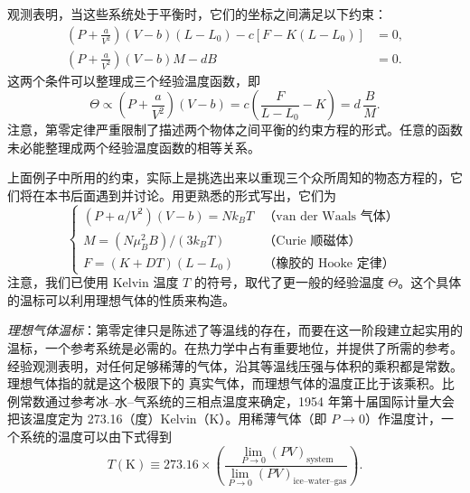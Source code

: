
观测表明，当这些系统处于平衡时，它们的坐标之间满足以下约束：
\begin{equation}
\begin{aligned}
\left(P+\frac{a}{V^2}\right)(V-b)(L-L_0)-c\left[F-K(L-L_0)\right]&=0,\\
\left(P+\frac{a}{V^2}\right)(V-b)M-dB&=0.
\end{aligned}
\label{eq:1.7}
\end{equation}
这两个条件可以整理成三个经验温度函数，即
\begin{equation}
\Theta\propto\left(P+\frac{a}{V^2}\right)(V-b)=c\left(\frac{F}{L-L_0}-K\right)=d\,\frac{B}{M}.
\label{eq:1.8}
\end{equation}
注意，第零定律严重限制了描述两个物体之间平衡的约束方程的形式。任意的函数未必能整理成两个经验温度函数的相等关系。

上面例子中所用的约束，实际上是挑选出来以重现三个众所周知的物态方程的，它们将在本书后面遇到并讨论。用更熟悉的形式写出，它们为
\begin{equation}
\left\{
\begin{array}{ll}
(P+a/V^2)(V-b)=Nk_BT & \text{（van der Waals 气体）}\\[2pt]
M=(N\mu_B^2B)/(3k_BT) & \text{（Curie 顺磁体）}\\[2pt]
F=(K+DT)(L-L_0) & \text{（橡胶的 Hooke 定律）}
\end{array}
\right.
\label{eq:1.9}
\end{equation}
注意，我们已使用 Kelvin 温度 $T$ 的符号，取代了更一般的经验温度 $\Theta$。这个具体的温标可以利用理想气体的性质来构造。

\emph{理想气体温标}：第零定律只是陈述了等温线的存在，而要在这一阶段建立起实用的温标，一个参考系统是必需的。在热力学中占有重要地位，并提供了所需的参考。经验观测表明，对任何足够稀薄的气体，沿其等温线压强与体积的乘积都是常数。理想气体指的就是这个极限下的
真实气体，而理想气体的温度正比于该乘积。比例常数通过参考冰–水–气系统的三相点温度来确定，1954 年第十届国际计量大会把该温度定为 273.16（度）Kelvin（K）。用稀薄气体（即 $P\to 0$）作温度计，一个系统的温度可以由下式得到
\begin{equation}
T(\mathrm{K})\equiv 273.16\times\left(\frac{\lim_{P\to 0}(PV)_{\text{system}}}{\lim_{P\to 0}(PV)_{\text{ice--water--gas}}}\right).
\label{eq:1.10}
\end{equation}


